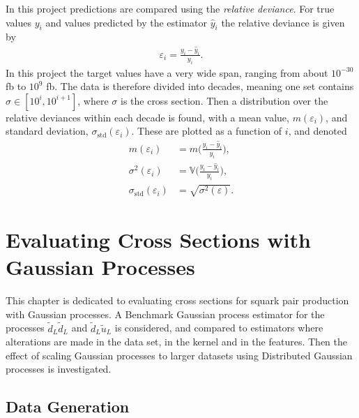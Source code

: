 \documentclass[twoside,english]{uiofysmaster}
\begin{document}
In this project predictions are compared using the \textit{relative deviance}. For true values $y_i$ and values predicted by the estimator $\hat{y}_i$ the relative deviance is given by
\begin{align}\label{Eq:: gaussian process : Relative deviance}
\varepsilon_i = \frac{y_i - \hat{y}_i}{y_i}.
\end{align} 
In this project the target values have a very wide span, ranging from about $10^{-30}$ fb to $10^9$ fb. The data is therefore divided into decades, meaning one set contains $\sigma \in [10^i, 10^{i+1}]$, where $\sigma$ is the cross section. Then a distribution over the relative deviances within each decade is found, with a mean value, $m(\varepsilon_i)$, and standard deviation, $\sigma_{\mathrm{std}}(\varepsilon_i)$. These are plotted as a function of $i$, and denoted
\begin{align}
m(\varepsilon_i) &= m \Big(\frac{y_i - \hat{y}_i}{y_i}\Big),\label{Eq:: gaussian process : rel deviance mean} \\
\sigma^2 (\varepsilon_i) &= \mathbb{V} \Big(\frac{y_i - \hat{y}_i}{y_i}\Big),\label{Eq:: gaussian process : rel deviance variance}\\
\sigma_{\mathrm{std}}(\varepsilon_i) &= \sqrt{\sigma^2(\varepsilon)}.
\end{align} 







\chapter{Evaluating Cross Sections with Gaussian Processes}

This chapter is dedicated to evaluating cross sections for squark pair production with Gaussian processes. A Benchmark Gaussian process estimator for the processes $\tilde{d}_L \tilde{d}_L$ and $\tilde{d}_L \tilde{u}_L$ is considered, and compared to estimators where alterations are made in the data set, in the kernel and in the features. Then the effect of scaling Gaussian processes to larger datasets using Distributed Gaussian processes is investigated.

\section{Data Generation}
\end{document}
